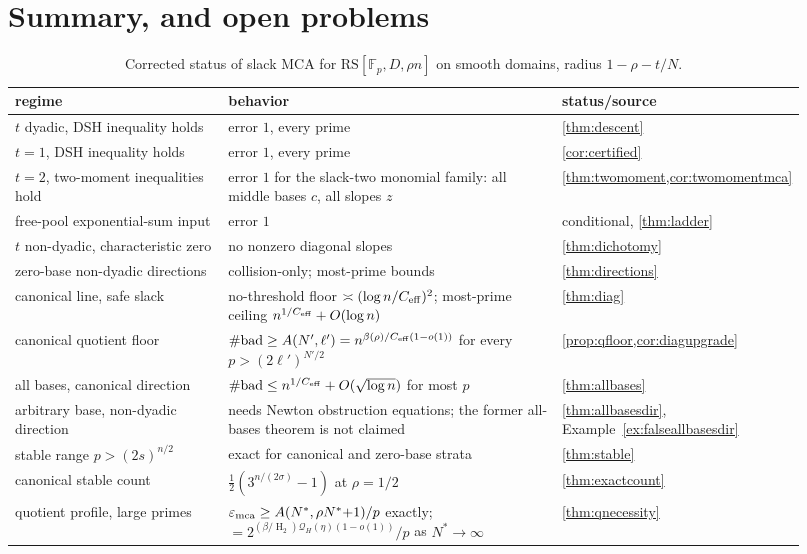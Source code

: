 \documentclass[11pt]{article}
\theoremstyle{definition}
\newcommand{\F}{\mathbb F}
\newcommand{\eps}{\varepsilon}
\newcommand{\HH}{\operatorname{H}_2}
\newcommand{\RS}{\mathrm{RS}}
\newcommand{\emca}{\eps_{\rm mca}}
\newcommand{\ceff}{C_{\rm eff}}
\newcommand{\Acl}{A}
\begin{document}
\section{Summary, and open problems}\label{sec:frontier}

\begin{table}[ht]\centering\small
\caption{Corrected status of slack MCA for $\RS[\F_p,D,\rho n]$ on smooth domains, radius $1-\rho-t/N$.}\label{tab:frontier}
\begin{tabular}{p{0.29\linewidth}p{0.43\linewidth}p{0.20\linewidth}}
\toprule
regime & behavior & status/source\\
\midrule
$t$ dyadic, DSH inequality holds & error $1$, every prime & \cref{thm:descent}\\
$t=1$, DSH inequality holds & error $1$, every prime & \cref{cor:certified}\\
$t=2$, two-moment inequalities hold & error $1$ for the slack-two monomial family: all middle bases $c$, all slopes $z$ & \cref{thm:twomoment,cor:twomomentmca}\\
free-pool exponential-sum input & error $1$ & conditional, \cref{thm:ladder}\\
$t$ non-dyadic, characteristic zero & no nonzero diagonal slopes & \cref{thm:dichotomy}\\
zero-base non-dyadic directions & collision-only; most-prime bounds & \cref{thm:directions}\\
canonical line, safe slack & no-threshold floor $\asymp(\log n/\ceff)^2$; most-prime ceiling $n^{1/\ceff}+O(\log n)$ & \cref{thm:diag}\\
canonical quotient floor & $\#\mathrm{bad}\ge A(N',\ell')=n^{\beta(\rho)/\ceff(1-o(1))}$ for every $p>(2\ell')^{N'/2}$ & \cref{prop:qfloor,cor:diagupgrade}\\
all bases, canonical direction & $\#\mathrm{bad}\le n^{1/\ceff}+O(\sqrt{\log n})$ for most $p$ & \cref{thm:allbases}\\
arbitrary base, non-dyadic direction & needs Newton obstruction equations; the former all-bases theorem is not claimed & \cref{thm:allbasesdir}, Example~\ref{ex:falseallbasesdir}\\
stable range $p>(2s)^{n/2}$ & exact for canonical and zero-base strata & \cref{thm:stable}\\
canonical stable count & $\tfrac12(3^{n/(2\sigma)}-1)$ at $\rho=1/2$ & \cref{thm:exactcount}\\
quotient profile, large primes & $\emca\ge\Acl(N^*,\rho N^*{+}1)/p$ exactly; $=2^{(\beta/\HH)\mathcal Q_H(\eta)(1-o(1))}/p$ as $N^*\to\infty$ & \cref{thm:qnecessity}\\

\end{tabular}
\end{table}
\end{document}
